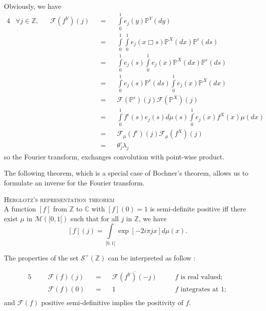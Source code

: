 Obviously, we have
\begin{alignat*}{4}
&\forall j \in \mathds{Z}, && \mathcal{F}(f^{Y})(j)&&=&&\int\limits_{0}^{1} e_{j}(y) \mathds{P}^{Y}(dy)\\
& && &&=&&\int\limits_{0}^{1}\int\limits_{0}^{1} e_{j}(x \Box s) \mathds{P}^{X}(dx)\mathds{P}^{\epsilon}(ds)\\
& && &&=&&\int\limits_{0}^{1}e_{j}(s)\int\limits_{0}^{1} e_{j}(x) \mathds{P}^{X}(dx)\mathds{P}^{\epsilon}(ds)\\
& && &&=&&\int\limits_{0}^{1}e_{j}(s)\mathds{P}^{\epsilon}(ds)\int\limits_{0}^{1} e_{j}(x)\mathds{P}^{X}(dx)\\
& && &&=&&\mathcal{F}(\mathds{P}^{\epsilon})(j) \mathcal{F}(\mathds{P}^{X})(j)\\
& && &&=&&\int\limits_{0}^{1} f^{\epsilon}(s) e_{j}(s) d\mu(s) \int\limits_{0}^{1} e_{j}(x) f^{X}(x)\mu(dx)\\
& && &&=&&\mathcal{F}_{\mu}(f^{\epsilon})(j) \mathcal{F}_{\mu}(f^{X})(j)\\
& && &&=&& \theta^{\circ}_{j} \lambda_{j}
\end{alignat*}
so the Fourier transform, exchanges convolution with point-wise product.

\medskip

The following theorem, which is a special case of Bochner's theorem, allows us to formulate an inverse for the Fourier transform.

\begin{thm}{\textsc{Herglotz's representation theorem}\\}\label{thm1.4.1}
A function $[f]$ from $\mathds{Z}$ to $\mathds{C}$ with $[f](0) = 1$ is semi-definite positive iff there exist $\mu$ in $\mathcal{M}([0, 1[)$ such that for all $j$ in $\mathds{Z}$, we have
\[[f](j) = \int\limits_{[0, 1[} \exp[- 2 i \pi j x] d\mu(x).\]
\end{thm}

The properties of the set $\mathcal{S}^{+}(\mathds{Z})$ can be interpreted as follow :

\begin{alignat*}{5}
& && \mathcal{F}(f)(j)&&=&& \overline{\mathcal{F}(f^{Y})(-j)}&& \quad f \text{ is real valued;}\\ 
& && \mathcal{F}(f)(0) &&=&& 1&& \quad f \text{ integrates at }1;\\
\end{alignat*}
and $\mathcal{F}(f)$ positive semi-definitive implies the positivity of $f$.

